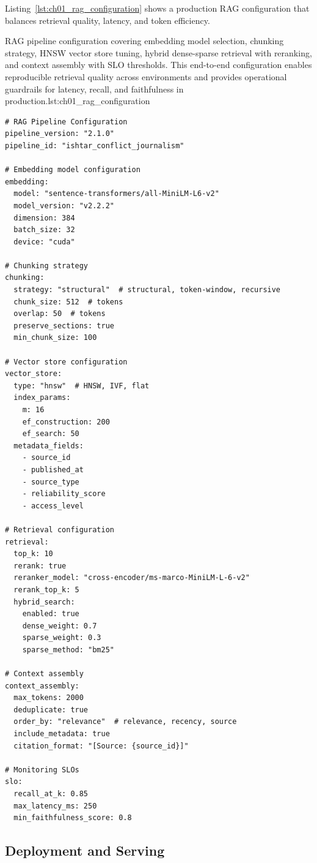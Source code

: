 Listing~\ref{lst:ch01_rag_configuration} shows a production RAG configuration that balances retrieval quality, latency, and token efficiency.

\begin{codebox}{RAG pipeline configuration covering embedding model selection, chunking strategy, HNSW vector store tuning, hybrid dense-sparse retrieval with reranking, and context assembly with SLO thresholds. This end-to-end configuration enables reproducible retrieval quality across environments and provides operational guardrails for latency, recall, and faithfulness in production.}{lst:ch01_rag_configuration}
\begin{verbatim}
# RAG Pipeline Configuration
pipeline_version: "2.1.0"
pipeline_id: "ishtar_conflict_journalism"

# Embedding model configuration
embedding:
  model: "sentence-transformers/all-MiniLM-L6-v2"
  model_version: "v2.2.2"
  dimension: 384
  batch_size: 32
  device: "cuda"

# Chunking strategy
chunking:
  strategy: "structural"  # structural, token-window, recursive
  chunk_size: 512  # tokens
  overlap: 50  # tokens
  preserve_sections: true
  min_chunk_size: 100

# Vector store configuration
vector_store:
  type: "hnsw"  # HNSW, IVF, flat
  index_params:
    m: 16
    ef_construction: 200
    ef_search: 50
  metadata_fields:
    - source_id
    - published_at
    - source_type
    - reliability_score
    - access_level

# Retrieval configuration
retrieval:
  top_k: 10
  rerank: true
  reranker_model: "cross-encoder/ms-marco-MiniLM-L-6-v2"
  rerank_top_k: 5
  hybrid_search:
    enabled: true
    dense_weight: 0.7
    sparse_weight: 0.3
    sparse_method: "bm25"

# Context assembly
context_assembly:
  max_tokens: 2000
  deduplicate: true
  order_by: "relevance"  # relevance, recency, source
  include_metadata: true
  citation_format: "[Source: {source_id}]"

# Monitoring SLOs
slo:
  recall_at_k: 0.85
  max_latency_ms: 250
  min_faithfulness_score: 0.8
\end{verbatim}
\end{codebox}

\subsection{Deployment and Serving}
\label{subsec:serving}

